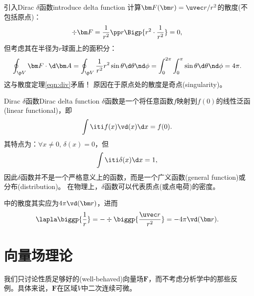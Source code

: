 \begin{example}{引入Dirac $\delta$函数}{introduce delta function}
    计算$\bm F(\bm r)=\uvec r/r^2$的散度(不包括原点)：
    \[
        \div\bm F=\frac1{r^2}\pp r\Bigp{r^2\cdot\frac1{r^2}}=0,
    \]
    但考虑其在半径为$r$球面上的面积分：
    \[
        \oint_{\p V}\bm F\cdot\d\bm A=\oint_{\p V}\frac1{r^2}r^2\sin\theta\d\theta\nd\phi=\int_0^{2\pi}\int_0^\pi\sin\theta\d\theta\nd\phi=4\pi.
    \]
    这与散度定理\eqref{eqn:div}矛盾！
    原因在于原点处的散度是奇点(singularity)。
\end{example}
\begin{definition}{Dirac $\delta$函数}{Dirac delta function}
    $\delta$函数是一个将任意函数$f$映射到$f(0)$的线性泛函(linear functional)，即
    \[
        \int\iti f(x)\vd(x)\d x=f(0).
    \]
    其特点为：$\forall x\neq 0,\,\delta(x)=0$，但
    \[
        \int\iti\delta(x)\d x=1,
    \]
    因此$\delta$函数并不是一个严格意义上的函数，而是一个广义函数(general function)或分布(distribution)。
    在物理上，$\delta$函数可以代表质点(或点电荷)的密度。
\end{definition}

\begin{corollary}
     中的散度其实应为$4\pi\vd(\bm r)$，进而
    \begin{equation}
        \lapla\biggp{\frac1r}=-\div\biggp{\frac{\uvec r}{r^2}}=-4\pi\vd(\bm r).
    \end{equation}
\end{corollary}

\section{向量场理论}

我们只讨论性质足够好的(well-behaved)向量场$\bm F$，而不考虑分析学中的那些反例。具体来说，$\bm F$在区域$V$中二次连续可微。


